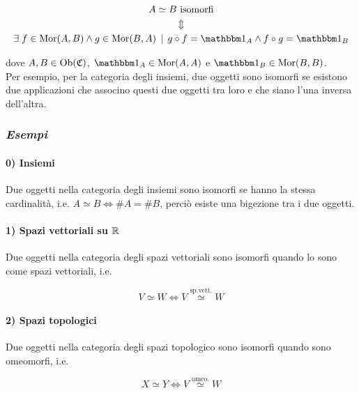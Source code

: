 \begin{gather}
	A \simeq B \text{ isomorfi} \nonumber \\
	\Updownarrow \\ %
	\E f \in \mor(A,B) \wedge g \in \mor(B,A) \, \mid \, g \circ f = \bigone_{A} \wedge f \circ g = \bigone_{B} \nonumber
\end{gather}

dove $ A,B \in \operatorname{Ob}(\mathfrak{C}) $, $ \bigone_{A} \in \mor(A,A) $ e $ \bigone_{B} \in \mor(B,B) $. \\
Per esempio, per la categoria degli insiemi, due oggetti sono isomorfi se esistono due applicazioni che associno questi due oggetti tra loro e che siano l'una inversa dell'altra.

\subsubsection{\textit{Esempi}}

\paragraph{0) Insiemi}

Due oggetti nella categoria degli insiemi sono isomorfi se hanno la stessa cardinalità, i.e. $ A \simeq B \iff \# A = \# B $, perciò esiste una bigezione tra i due oggetti.

\paragraph{1) Spazi vettoriali su $ \mathbb{R} $}

Due oggetti nella categoria degli spazi vettoriali sono isomorfi quando lo sono come spazi vettoriali, i.e.

\begin{equation}
	V \simeq W \iff V \stackrel{\text{sp.vett.}}{\simeq} W
\end{equation}

\paragraph{2) Spazi topologici}

Due oggetti nella categoria degli spazi topologico sono isomorfi quando sono omeomorfi, i.e.

\begin{equation}
	X \simeq Y \iff V \stackrel{\text{omeo.}}{\simeq} W
\end{equation}

